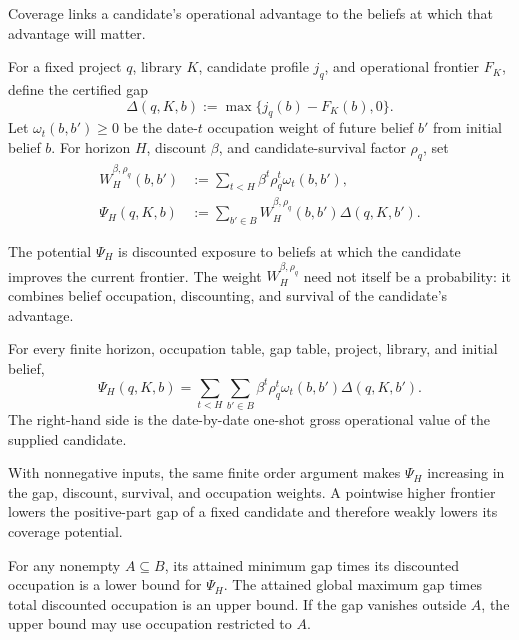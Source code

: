 Coverage links a candidate's operational advantage to the beliefs at which
that advantage will matter.

\begin{definition}
\label{def:coverage-potential}
For a fixed project \(q\), library \(K\), candidate profile \(j_q\), and
operational frontier \(F_K\), define the certified gap
\[
  \Delta(q,K,b):=\max\{j_q(b)-F_K(b),0\}.
\]
Let \(\omega_t(b,b')\ge0\) be the date-\(t\) occupation weight of future
belief \(b'\) from initial belief \(b\).  For horizon \(H\), discount
\(\beta\), and candidate-survival factor \(\rho_q\), set
\begin{align}
  W_H^{\beta,\rho_q}(b,b')
    &:=\sum_{t<H}\beta^t\rho_q^t\omega_t(b,b'),
    \label{eq:discounted-coverage-occupation}\\
  \Psi_H(q,K,b)
    &:=\sum_{b'\in B}W_H^{\beta,\rho_q}(b,b')
      \Delta(q,K,b').
    \label{eq:coverage-potential}
\end{align}
\end{definition}

The potential \(\Psi_H\) is discounted exposure to beliefs at which the
candidate improves the current frontier.  The weight
\(W_H^{\beta,\rho_q}\) need not itself be a probability: it combines belief
occupation, discounting, and survival of the candidate's advantage.

\begin{theorem}
\label{thm:coverage-potential-representation}
For every finite horizon, occupation table, gap table, project, library, and
initial belief,
\begin{equation}\label{eq:coverage-representation}
  \Psi_H(q,K,b)
  =\sum_{t<H}\sum_{b'\in B}
    \beta^t\rho_q^t\omega_t(b,b')\Delta(q,K,b').
\end{equation}
The right-hand side is the date-by-date one-shot gross operational value of
the supplied candidate.
\end{theorem}

With nonnegative inputs, the same finite order argument makes
\(\Psi_H\) increasing in the gap, discount, survival, and occupation weights.
A pointwise higher frontier lowers the positive-part gap of a fixed candidate
and therefore weakly lowers its coverage potential.

\begin{corollary}
\label{cor:coverage-potential-bounds}
For any nonempty \(A\subseteq B\), its attained minimum gap times its
discounted occupation is a lower bound for \(\Psi_H\).  The attained global
maximum gap times total discounted occupation is an upper bound.  If the gap
vanishes outside \(A\), the upper bound may use occupation restricted to
\(A\).
\end{corollary}

